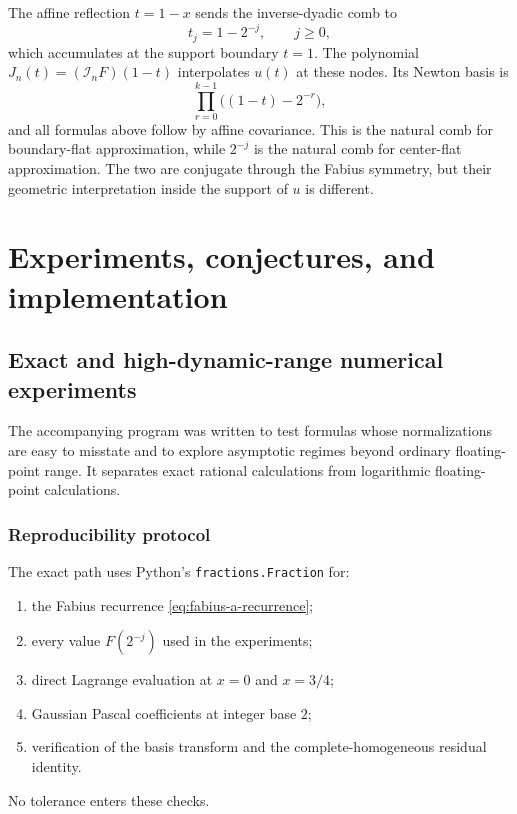 \documentclass[11pt,oneside]{book}
\numberwithin{equation}{chapter}
\theoremstyle{definition}
\theoremstyle{remark}
\newcommand{\Interp}{\mathcal I}
\begin{document}
The affine reflection $t=1-x$ sends the inverse-dyadic comb to
\begin{equation}
 t_j=1-2^{-j},
 \qquad j\ge0,
 \label{eq:up-boundary-comb}
\end{equation}
which accumulates at the support boundary $t=1$.  The polynomial
$J_n(t)=(\Interp_nF)(1-t)$ interpolates $u(t)$ at these nodes.  Its Newton
basis is
\begin{equation}
 \prod_{r=0}^{k-1}\bigl((1-t)-2^{-r}\bigr),
 \label{eq:reflected-newton-basis}
\end{equation}
and all formulas above follow by affine covariance.  This is the natural
comb for boundary-flat approximation, while $2^{-j}$ is the natural comb
for center-flat approximation.  The two are conjugate through the Fabius
symmetry, but their geometric interpretation inside the support of $u$ is
different.

\part{Experiments, conjectures, and implementation}

\chapter{Exact and high-dynamic-range numerical experiments}
\label{chap:numerics}

The accompanying program
 was written to test formulas whose
normalizations are easy to misstate and to explore asymptotic regimes beyond
ordinary floating-point range.  It separates exact rational calculations
from logarithmic floating-point calculations.

\section{Reproducibility protocol}

The exact path uses Python's \texttt{fractions.Fraction} for:
\begin{enumerate}
\item the Fabius recurrence \eqref{eq:fabius-a-recurrence};
\item every value $F(2^{-j})$ used in the experiments;
\item direct Lagrange evaluation at $x=0$ and $x=3/4$;
\item Gaussian Pascal coefficients at integer base $2$;
\item verification of the basis transform and the complete-homogeneous
      residual identity.
\end{enumerate}
No tolerance enters these checks.
\end{document}

